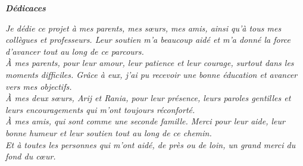 \begin{center}
    \textbf{\textit{\Huge Dédicaces}}\\
\end{center}
\vspace{1.5cm}
\begin{center}
    \textit{Je dédie ce projet à mes parents, mes sœurs, mes amis, ainsi qu’à tous mes collègues et professeurs. Leur soutien m’a beaucoup aidé et m’a donné la force d’avancer tout au long de ce parcours.}\\
    \vspace{0.9cm}
    \textit{À mes parents, pour leur amour, leur patience et leur courage, surtout dans les moments difficiles. Grâce à eux, j’ai pu recevoir une bonne éducation et avancer vers mes objectifs.}\\
    \vspace{0.9cm}    
    \textit{À mes deux sœurs, Arij et Rania, pour leur présence, leurs paroles gentilles et leurs encouragements qui m’ont toujours réconforté.}\\
    \vspace{0.9cm}
    \textit{À mes amis, qui sont comme une seconde famille. Merci pour leur aide, leur bonne humeur et leur soutien tout au long de ce chemin.}\\
    \vspace{0.9cm}
    \textit{Et à toutes les personnes qui m’ont aidé, de près ou de loin, un grand merci du fond du cœur.}\\
\end{center}
